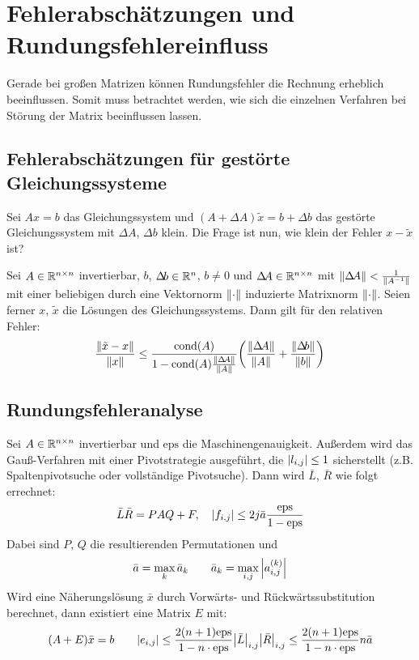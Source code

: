 	\section{Fehlerabschätzungen und Rundungsfehlereinfluss}
		Gerade bei großen Matrizen können Rundungsfehler die Rechnung erheblich beeinflussen. Somit muss betrachtet werden, wie sich die einzelnen Verfahren bei Störung der Matrix beeinflussen lassen.

		\subsection{Fehlerabschätzungen für gestörte Gleichungssysteme}
			Sei \( Ax = b \) das Gleichungssystem und \( (A + \Delta\!A)\tilde{x} = b + \Delta\!b \) das gestörte Gleichungssystem mit \( \Delta\!A \), \( \Delta\!b \) klein. Die Frage ist nun, wie klein der Fehler \( x - \tilde{x} \) ist?

			Sei \( A \in \mathbb{R}^{n \times n} \) invertierbar, \(b\), \(\Delta\!b \in \mathbb{R}^n\), \(b \neq 0\) und \(\Delta\!A \in \mathbb{R}^{n \times n}\) mit \( \norm{\Delta\!A} < \frac{1}{\norm{A^{-1}}} \) mit einer beliebigen durch eine Vektornorm \( \norm{\cdot} \) induzierte Matrixnorm \( \norm{\cdot} \). Seien ferner \(x\), \(\tilde{x}\) die Lösungen des Gleichungssystems. Dann gilt für den relativen Fehler:
			\begin{equation*}
				\frac{\norm{\tilde{x} - x}}{\norm{x}} \leq \frac{\operatorname{cond}(A)}{1 - \operatorname{cond}(A) \frac{\norm{\Delta\!A}}{\norm{A}}} \bigg( \frac{\norm{\Delta\!A}}{\norm{A}} + \frac{\norm{\Delta\!b}}{\norm{b}} \bigg)
			\end{equation*}

		\subsection{Rundungsfehleranalyse}
			Sei \( A \in \mathbb{R}^{n \times n} \) invertierbar und \( \textrm{eps} \) die Maschinengenauigkeit. Außerdem wird das Gauß-Verfahren mit einer Pivotstrategie ausgeführt, die \( \abs{l_{i,j}} \leq 1 \) sicherstellt (z.B. Spaltenpivotsuche oder vollständige Pivotsuche). Dann wird \( \bar{L} \), \( \bar{R} \) wie folgt errechnet:
			\begin{equation*}
				\bar{L}\bar{R} = PAQ + F, \quad \abs{f_{i,j}} \leq 2 j \bar{a} \frac{\textrm{eps}}{1 - \textrm{eps}}
			\end{equation*}
			Dabei sind \(P\), \(Q\) die resultierenden Permutationen und
			\begin{equation*}
				\bar{a} = \max_k \bar{a}_k \qquad \bar{a}_k = \max_{i,j} \abs{a_{i,j}^{(k)}}
			\end{equation*}
			Wird eine Näherungslösung \( \bar{x} \) durch Vorwärts- und Rückwärtssubstitution berechnet, dann existiert eine Matrix \(E\) mit:
			\begin{equation*}
				(A + E) \bar{x} = b \qquad \abs{e_{i,j}} \leq \frac{2(n + 1) \textrm{eps}}{1 - n \cdot \textrm{eps}} \abs{\bar{L}}_{i,j} \abs{\bar{R}}_{i,j} \leq \frac{2(n + 1) \textrm{eps}}{1 - n \cdot \textrm{eps}} n \bar{a}
			\end{equation*}

